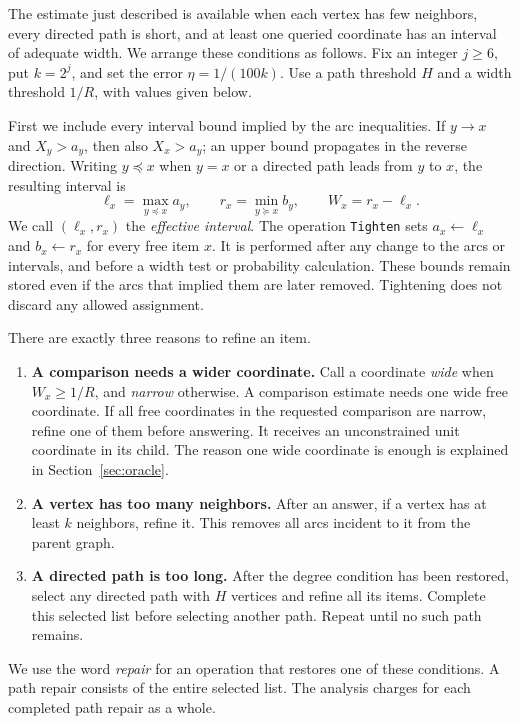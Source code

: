 The estimate just described is available when each vertex has few neighbors,
every directed path is short, and at least one queried coordinate has an
interval of adequate width. We arrange these conditions as follows. Fix an
integer $j\ge6$, put $k=2^j$, and set the error $\eta=1/(100k)$.
Use a path threshold $H$ and a
width threshold $1/R$, with values given below.

First we include every interval bound implied by the arc inequalities. If
$y\to x$ and $X_y>a_y$, then also $X_x>a_y$; an upper bound propagates in
the reverse direction. Writing $y\preceq x$ when $y=x$ or a directed path
leads from $y$ to $x$, the resulting interval is
\begin{equation}\label{eq:effective}
\ell_x=\max_{y\preceq x}a_y,\qquad
r_x=\min_{y\succeq x}b_y,\qquad W_x=r_x-\ell_x.
\end{equation}
We call $(\ell_x,r_x)$ the \emph{effective interval}. The operation
\texttt{Tighten} sets $a_x\gets\ell_x$ and $b_x\gets r_x$
for every free item $x$. It is performed after
any change to the arcs or intervals, and before a width test or probability
calculation. These bounds remain stored even if the arcs that implied
them are later removed. Tightening does not discard any allowed assignment.

There are exactly three reasons to refine an item.
\begin{enumerate}
\item \textbf{A comparison needs a wider coordinate.}
Call a coordinate \emph{wide} when $W_x\ge1/R$, and \emph{narrow}
otherwise. A comparison estimate needs one wide free coordinate. If all
free coordinates in the requested comparison are narrow, refine one of
them before answering. It receives an unconstrained unit coordinate in its
child. The reason one wide coordinate is enough is explained in
Section~\ref{sec:oracle}.
\item \textbf{A vertex has too many neighbors.}
After an answer, if a vertex has at least $k$ neighbors, refine it.
This removes all arcs incident to it from the parent graph.
\item \textbf{A directed path is too long.}
After the degree condition has been restored, select any directed path
with $H$ vertices and refine all its items. Complete this selected list
before selecting another path. Repeat until no such path remains.
\end{enumerate}
We use the word \emph{repair} for an operation that restores one of these
conditions. A path repair consists of the entire selected list. The analysis charges for each completed path repair as a whole.

